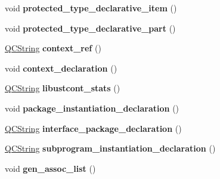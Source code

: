\begin{DoxyCompactItemize}
void {\bfseries protected\+\_\+type\+\_\+declarative\+\_\+item} ()
\item 
\mbox{\label{classvhdl_1_1parser_1_1_vhdl_parser_a3a0d603898f128c45b342c12b7838a3b}} 
void {\bfseries protected\+\_\+type\+\_\+declarative\+\_\+part} ()
\item 
\mbox{\label{classvhdl_1_1parser_1_1_vhdl_parser_a282b18e630b2b1d40c7675342e423eb0}} 
\mbox{\hyperlink{class_q_c_string}{Q\+C\+String}} {\bfseries context\+\_\+ref} ()
\item 
\mbox{\label{classvhdl_1_1parser_1_1_vhdl_parser_a0963acfd4be88c9f9f32a809456b793b}} 
void {\bfseries context\+\_\+declaration} ()
\item 
\mbox{\label{classvhdl_1_1parser_1_1_vhdl_parser_a58f4e8b71b115da7494c1a3b671fb63c}} 
\mbox{\hyperlink{class_q_c_string}{Q\+C\+String}} {\bfseries libustcont\+\_\+stats} ()
\item 
\mbox{\label{classvhdl_1_1parser_1_1_vhdl_parser_a5e199823d9087693452bdbbe69ee38de}} 
void {\bfseries package\+\_\+instantiation\+\_\+declaration} ()
\item 
\mbox{\label{classvhdl_1_1parser_1_1_vhdl_parser_a31654abb75d42dc803a7b28d6ac4e917}} 
\mbox{\hyperlink{class_q_c_string}{Q\+C\+String}} {\bfseries interface\+\_\+package\+\_\+declaration} ()
\item 
\mbox{\label{classvhdl_1_1parser_1_1_vhdl_parser_abe429b509d12702d7f5d68f8a4e92301}} 
\mbox{\hyperlink{class_q_c_string}{Q\+C\+String}} {\bfseries subprogram\+\_\+instantiation\+\_\+declaration} ()
\item 
\mbox{\label{classvhdl_1_1parser_1_1_vhdl_parser_aca8ccd23692c3580e46a829b89b56f77}} 
void {\bfseries gen\+\_\+assoc\+\_\+list} ()
\item 
\mbox{\label{classvhdl_1_1parser_1_1_vhdl_parser_aa213e107a77c193f19a32f28c8fdb13f}} 

\end{DoxyCompactItemize}
